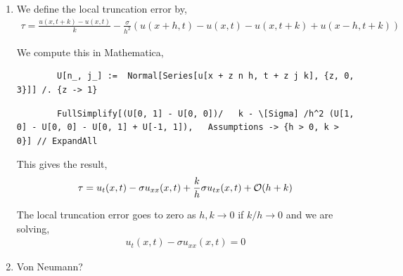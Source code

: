 \documentclass[10pt]{article}
\begin{document}
\begin{solution}[Solution]
\begin{enumerate}[label=(\alph*)]
    \item We define the local truncation error by,
    \begin{align*}
        \tau = \frac{u(x,t+k) - u(x,t)}{k} - \frac{\sigma}{h^2} (u(x+h,t)-u(x,t)-u(x,t+k)+u(x-h,t+k))
    \end{align*}
    
        We compute this in Mathematica,
        \begin{lstlisting}
        U[n_, j_] :=  Normal[Series[u[x + z n h, t + z j k], {z, 0, 3}]] /. {z -> 1}
    \end{lstlisting}
    \begin{lstlisting}
        FullSimplify[(U[0, 1] - U[0, 0])/   k - \[Sigma] /h^2 (U[1, 0] - U[0, 0] - U[0, 1] + U[-1, 1]),   Assumptions -> {h > 0, k > 0}] // ExpandAll
    \end{lstlisting}

    This gives the result,
        \begin{align*}
            \tau = u_t(x,t) - \sigma u_{xx}(x,t) + \frac{k}{h}\sigma u_{tx}(x,t) + \mathcal{O}(h+k)    
        \end{align*}
       
    The local truncation error goes to zero as \( h,k\to 0 \) if \( k/h\to 0 \) and we are solving,
        \begin{align*}
            u_t(x,t) -\sigma u_{xx}(x,t) = 0
        \end{align*}
       
    \item

        Von Neumann?

\end{enumerate}

\end{solution}
\end{document}
